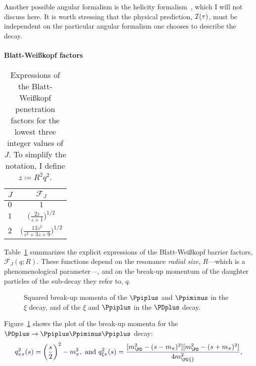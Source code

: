     Another possible angular formalism is the helicity formalism~\cite{jacob1959404}, which I will not discuss here.
    It is worth stressing that the physical prediction, $\mathcal{I}(\tau)$, must be independent on the particular angular formalism one chooses to describe the decay.


    \paragraph{Blatt-Wei\ss{}kopf factors}

    \begin{table}
        \centering
        \caption{Expressions of the Blatt-Wei\ss{}kopf penetration factors for the lowest three integer values of $J$. To simplify the notation, I define $z\coloneqq R^2 q^2$.}
        \label{table:blatt_weisskopf}
        \begin{tabular}{lc}
            \toprule
            $J$ &$\mathcal{F}_{\!J}$\\
            \midrule
            $0$ &$1$ \\
            $1$ &$\bigg(\displaystyle\frac{2z}{z + 1}\bigg)^{1/2}$ \\
            $2$ &$\bigg(\displaystyle\frac{13 z^2 }{z^2 + 3z + 9}\bigg)^{1/2}$ \\
            \bottomrule
        \end{tabular}
    \end{table}
    Table~\ref{table:blatt_weisskopf} summarizes the explicit expressions of the Blatt-Wei\ss{}kopf barrier factors, $\mathcal{F}_{\!J}(q; R)$.
    These functions depend on the resonance \emph{radial size}, $R$---which is a phenomenological parameter---, and on the break-up momentum of the daughter particles of the sub-decay they refer to, $q$.
    \begin{figure}
        \centering
        
        \caption{Squared break-up momenta of the $\Ppiplus$ and $\Ppiminus$ in the $\xi$ decay, and of the $\xi$ and $\Ppiplus$ in the $\PDplus$ decay.}
        \label{fig:break_up_momenta}
    \end{figure}
    Figure~\ref{fig:break_up_momenta} shows the plot of the break-up momenta for the $\PDplus\to\Ppiplus\Ppiminus\Ppiplus$ decay:
    \begin{equation}
        q_{\pi\pi}^2(s) = \bigg(\frac{s}{2}\bigg)^2 - m_{\pi}^2,
        \text{ and }
        q_{\xi\pi}^2(s) = \frac{[m_{\PD}^2 - (s - m_\pi)^2][m_{\PD}^2 - (s+m_\pi)^2]}{4m_{\PD{}}^2},
    \end{equation}
